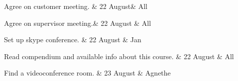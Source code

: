 \nextItem
Agree on customer meeting. &
22 August&
All

\nextItem
Agree on supervisor meeting.&
22 August &
All

\nextItem
Set up skype conference. &
22 August &
Jan

\nextItem
Read compendium and available info about this course. &
22 August &
All

\nextItem
Find a videoconference room. &
23 August &
Agnethe
